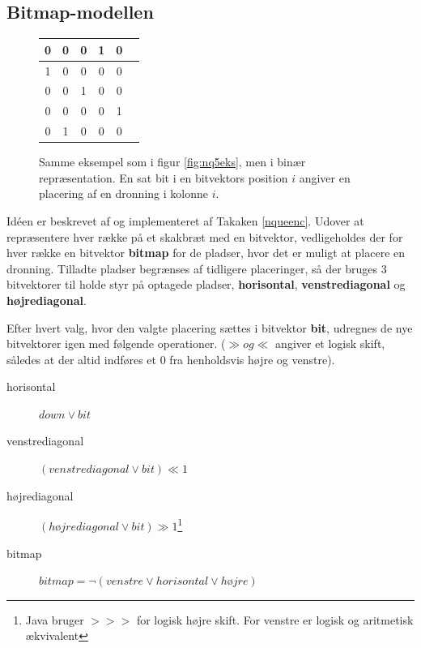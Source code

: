 \documentclass[final,a4paper,11pt]{article}
\begin{document}

\subsection{Bitmap-modellen}\label{bitmapmodellen}

\begin{figure}[!h]
\begin{center}
\begin{tabular}{|c|c|c|c|c|c}
\hline	0 & 0 & 0 & 1 & 0 \\
\hline	1 & 0 & 0 & 0 & 0 \\
\hline	0 & 0 & 1 & 0 & 0 \\
\hline	0 & 0 & 0 & 0 & 1 \\
\hline	0 & 1 & 0 & 0 & 0 \\
\hline
\end{tabular}
\end{center}
\caption{Samme eksempel som i figur \ref{fig:nq5eks}, men i binær repræsentation. En sat bit i en bitvektors position $i$ angiver en placering af en dronning i kolonne $i$.}
\label{fig:nq5eksbitmap}
\end{figure}

Idéen er beskrevet af \cite{Zongyan02} og implementeret af Takaken \ref{nqueenc}. Udover at repræsentere hver række på et skakbræt med en bitvektor, vedligeholdes der for hver række  en bitvektor \textbf{bitmap} for de pladser, hvor det er muligt at placere en dronning. Tilladte pladser begrænses af tidligere placeringer, så der bruges 3 bitvektorer til holde styr på optagede pladser, \textbf{horisontal}, \textbf{venstrediagonal}  og \textbf{højrediagonal}.

Efter hvert valg, hvor den valgte placering sættes i bitvektor \textbf{bit}, udregnes de nye bitvektorer igen med følgende operationer. ($\gg og \ll$ angiver et logisk skift, således at der altid indføres et $0$ fra henholdsvis højre og venstre).
\begin{description}
	\item[horisontal] $down \lor bit$ 
	\item[venstrediagonal] $(venstrediagonal \lor bit) \ll 1$
	\item[højrediagonal] $(højrediagonal \lor bit) \gg  1$\footnote{Java bruger $>>>$ for logisk højre skift. For venstre er logisk og aritmetisk ækvivalent}
	\item[bitmap]	$bitmap = \lnot(venstre \lor horisontal \lor højre)$	
\end{description}
\end{document}
